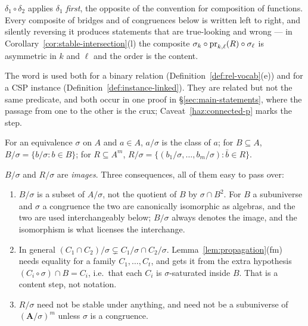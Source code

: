 \begin{hazard}\label{haz:comp-order}
$\delta_{1}\circ\delta_{2}$ applies $\delta_{1}$ \emph{first}, the opposite
of the convention for composition of functions. Every composite of bridges and
of congruences below is written left to right, and silently reversing it
produces statements that are true-looking and wrong ---
in Corollary~\ref{cor:stable-intersection}(l) the composite
$\sigma_{k}\circ\operatorname*{pr}_{k,\ell}(R)\circ\sigma_{\ell}$ is asymmetric in $k$ and
$\ell$ and the order is the content.
\end{hazard}

\begin{hazard}\label{haz:linked}
The word is used both for a binary relation (Definition~\ref{def:rel-vocab}(e))
and for a CSP instance (Definition~\ref{def:instance-linked}). They are related
but not the same predicate, and both occur in one proof in
\S\ref{sec:main-statements}, where the passage from one to the other is the
crux; Caveat~\ref{haz:connected-p} marks the step.
\end{hazard}

\begin{definition}\label{def:quotient-rel}
For an equivalence $\sigma$ on $A$ and $a\in A$, $a/\sigma$ is the class of
$a$; for $B\subseteq A$, $B/\sigma=\{b/\sigma:b\in B\}$; for
$R\subseteq A^{m}$, $R/\sigma=\{(b_{1}/\sigma,\dots,b_{m}/\sigma):\bar b\in R\}$.
\end{definition}

\begin{hazard}\label{haz:quotient-rel}
$B/\sigma$ and $R/\sigma$ are \emph{images}. Three consequences, all of them
easy to pass over:
\begin{enumerate}\alphlabels\tightlist
\item $B/\sigma$ is a subset of $A/\sigma$, not the quotient of $B$ by
  $\sigma\cap B^{2}$. For $B$ a subuniverse and $\sigma$ a congruence the two
  are canonically isomorphic as algebras, and the two are used
  interchangeably below; $B/\sigma$ always denotes the image, and the
  isomorphism is what licenses the interchange.
\item In general $(C_{1}\cap C_{2})/\sigma\subsetneq C_{1}/\sigma\cap
  C_{2}/\sigma$. Lemma~\ref{lem:propagation}(fm) needs equality for a family
  $C_{1},\dots,C_{t}$, and gets it from the extra hypothesis
  $(C_{i}\circ\sigma)\cap B=C_{i}$, i.e.\ that each $C_{i}$ is
  $\sigma$-saturated inside $B$. That is a content step, not notation.
\item $R/\sigma$ need not be stable under anything, and need not be a
  subuniverse of $(\mathbf A/\sigma)^{m}$ unless $\sigma$ is a congruence.
\end{enumerate}
\end{hazard}

